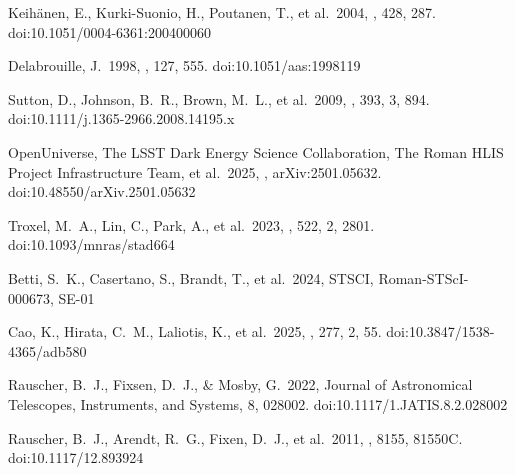 \documentclass[12pt]{pasj01}
\begin{document}
\begin{thebibliography}{}
 Keih{\"a}nen, E., Kurki-Suonio, H., Poutanen, T., et al.\ 2004, \aap, 428, 287. doi:10.1051/0004-6361:200400060

 Delabrouille, J.\ 1998, \aaps, 127, 555. doi:10.1051/aas:1998119

 Sutton, D., Johnson, B.~R., Brown, M.~L., et al.\ 2009, \mnras, 393, 3, 894. doi:10.1111/j.1365-2966.2008.14195.x

 OpenUniverse, The LSST Dark Energy Science Collaboration, The Roman HLIS Project Infrastructure Team, et al.\ 2025, , arXiv:2501.05632. doi:10.48550/arXiv.2501.05632

 Troxel, M.~A., Lin, C., Park, A., et al.\ 2023, \mnras, 522, 2, 2801. doi:10.1093/mnras/stad664

 Betti, S.~K., Casertano, S., Brandt, T., et al.\ 2024, STSCI, Roman-STScI-000673, SE-01

 Cao, K., Hirata, C.~M., Laliotis, K., et al.\ 2025, \apjs, 277, 2, 55. doi:10.3847/1538-4365/adb580

 Rauscher, B.~J., Fixsen, D.~J., \& Mosby, G.\ 2022, Journal of Astronomical Telescopes, Instruments, and Systems, 8, 028002. doi:10.1117/1.JATIS.8.2.028002

 Rauscher, B.~J., Arendt, R.~G., Fixen, D.~J., et al.\ 2011, \procspie, 8155, 81550C. doi:10.1117/12.893924



 \end{thebibliography}
\end{document}

